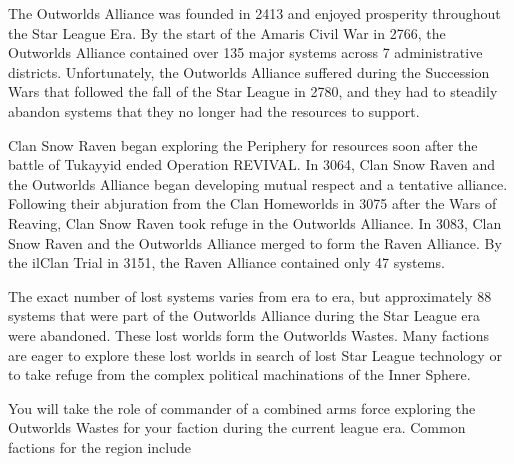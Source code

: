 The Outworlds Alliance was founded in 2413 and enjoyed prosperity throughout the Star League Era.
By the start of the Amaris Civil War in 2766, the Outworlds Alliance contained over 135 major systems across 7 administrative districts.
Unfortunately, the Outworlds Alliance suffered during the Succession Wars that followed the fall of the Star League in 2780, and they had to steadily abandon systems that they no longer had the resources to support.

Clan Snow Raven began exploring the Periphery for resources soon after the battle of Tukayyid ended Operation REVIVAL.
In 3064, Clan Snow Raven and the Outworlds Alliance began developing mutual respect and a tentative alliance.
Following their abjuration from the Clan Homeworlds in 3075 after the Wars of Reaving, Clan Snow Raven took refuge in the Outworlds Alliance.
In 3083, Clan Snow Raven and the Outworlds Alliance merged to form the Raven Alliance.
By the ilClan Trial in 3151, the Raven Alliance contained only 47 systems.

The exact number of lost systems varies from era to era, but approximately 88 systems that were part of the Outworlds Alliance during the Star League era were abandoned.
These lost worlds form the Outworlds Wastes.
Many factions are eager to explore these lost worlds in search of lost Star League technology or to take refuge from the complex political machinations of the Inner Sphere.

You will take the role of commander of a combined arms force exploring the Outworlds Wastes for your faction during the current league era.
Common factions for the region include
